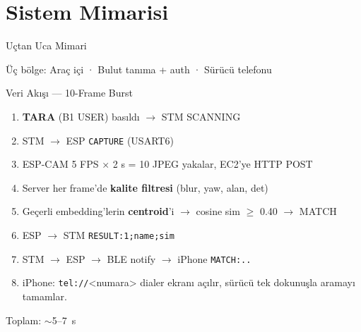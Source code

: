 \documentclass[aspectratio=169,12pt]{beamer}
\begin{document}
\section{Sistem Mimarisi}

\begin{frame}{Uçtan Uca Mimari}
    \begin{center}
    \end{center}

    Üç bölge: Araç içi · Bulut tanıma + auth · Sürücü telefonu
\end{frame}

\begin{frame}{Veri Akışı --- 10-Frame Burst}
    \begin{enumerate}
        \item \textbf{TARA} (B1 USER) basıldı $\rightarrow$ STM SCANNING
        \item STM $\rightarrow$ ESP \texttt{CAPTURE} (USART6)
        \item ESP-CAM 5 FPS × 2 s = 10 JPEG yakalar, EC2'ye HTTP POST
        \item Server her frame'de \textbf{kalite filtresi} (blur, yaw, alan, det)
        \item Geçerli embedding'lerin \textbf{centroid}'i $\rightarrow$
              cosine sim $\geq$ 0.40 $\rightarrow$ MATCH
        \item ESP $\rightarrow$ STM \texttt{RESULT:1;name;sim}
        \item STM $\rightarrow$ ESP $\rightarrow$ BLE notify $\rightarrow$ iPhone \texttt{MATCH:..}
        \item iPhone: \texttt{tel://}<numara> dialer ekranı açılır,
              sürücü tek dokunuşla aramayı tamamlar.
    \end{enumerate}

    \vspace{0.3cm}
    Toplam: \alert{$\sim$5--7~s}
\end{frame}

\end{document}
